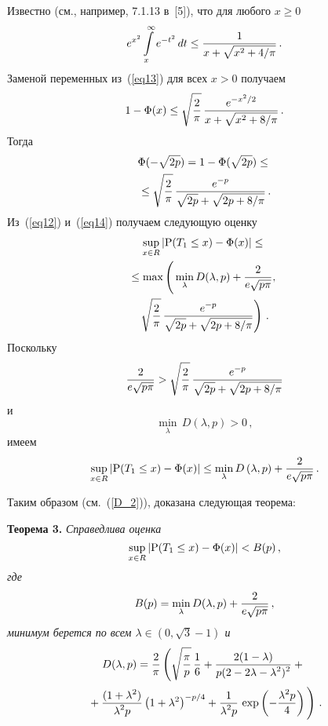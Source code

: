 \begin{multicols}{2}
Известно (см., например, 7.1.13 в~[5]), что для любого     $x \ge 0$
\begin{equation}
 e^{x^2} \int\limits^{\infty}_{x} e^{- t^2} \,dt \leq \displaystyle\frac{\displaystyle 1\mathstrut}{\displaystyle x + \sqrt{x^2 + 4/\pi}\mathstrut}\,. 
 \label{eq13}
\end{equation}
Заменой переменных из~(\ref{eq13})  для всех $x > 0$ получаем
$$
   1 -\mbox{$\Phi$}(x) \leq  \sqrt{\displaystyle\frac{\displaystyle 2\mathstrut}{\displaystyle \pi\mathstrut}}\, \displaystyle\frac{\displaystyle e^{-x^2/2}\mathstrut}{\displaystyle x + \sqrt{x^2 + 8/\pi}\mathstrut}\,.
$$
Тогда
\begin{multline}
\mbox{$\Phi$}(-\sqrt{2p})  = 1 - \mbox{$\Phi$}(\sqrt{2p})\leq{}\\
{} \leq \sqrt{\displaystyle\frac{\displaystyle 2\mathstrut}{\displaystyle \pi\mathstrut}}\, \displaystyle\frac{\displaystyle e^{-p}\mathstrut}{\displaystyle \sqrt{2p} + \sqrt{2p + 8/\pi}\mathstrut}\,.
 \label{eq14}
\end{multline}
 Из~(\ref{eq12}) и~(\ref{eq14})  получаем следующую оценку
\begin{multline*}
\sup\limits_{x \in R} |\P(T_1 \leq x) - \IP(x)| \leq{}\\
{}\leq
\max\left(\vphantom{\fr{e^{-p}}{\sqrt{2}}}
\min_{\lambda} D(\lambda,p) + \fr{2}{e\sqrt{p \pi}},\,{}\right.\\
\left.\sqrt{\fr{2}{\pi}}\, \fr{e^{-p}}{\sqrt{2p}+\sqrt{2p + 8/\pi}}\right)\,.
\end{multline*}
Поскольку       
$$
\displaystyle\frac{\displaystyle 2\mathstrut}{\displaystyle e\sqrt{p \pi}\mathstrut} > \sqrt{\displaystyle\frac{\displaystyle 2\mathstrut}{\displaystyle \pi\mathstrut}}\, \displaystyle\frac{\displaystyle e^{-p}\mathstrut}{\displaystyle \sqrt{2p}+\sqrt{2p + 8/\pi}\mathstrut}
$$
и 
$$\min\limits_{\lambda} \,D(\lambda,p) >0\,,
$$ 
имеем
\begin{equation*}
\sup\limits_{x \in R} |\mbox{\rm P}(T_1 \le x) - \mbox{$\Phi$}(x)| \leq \underset{\lambda}{\min}\,D\left(\lambda,p\right)
+ \displaystyle\frac{\displaystyle 2\mathstrut}{\displaystyle e\sqrt{p \pi}\mathstrut}\,.
\end{equation*}

Таким образом (см.~(\ref{D_2})), доказана следующая теорема:

\smallskip

\noindent
\textbf{Теорема 3.} %
\textit{Справедлива оценка}
\begin{equation*}
\sup\limits_{x \in R}|\mbox{\rm P}(T_1 \leq x) - \mbox{$\Phi$}(x) | <B(p)\,,
\end{equation*}
\textit{где}
\begin{equation}
B(p)= \underset{\lambda}{\min}\,D(\lambda,p) + \displaystyle\frac{\displaystyle 2\mathstrut}{\displaystyle e\sqrt{p \pi}\mathstrut}\,, 
\label{eq.11}
\end{equation}
\textit{минимум берется по всем $\lambda \in (0,\sqrt{3}-1)$
и}
\begin{multline*}
D(\lambda,p) =\fr{2}{\pi} \left( \sqrt{\fr{\pi}{p}}\,\fr{1}{6}
 +\fr{ 2 (1-\lambda)}{p(2-2\lambda-\lambda^2)^2}+{}\right.\\
\left. {}+ \fr{(1+
\lambda^2)}{\lambda^2 p} \left(1+\lambda^2\right)^{-p/4}
  + \fr{1}{\lambda^2 p} \,\exp \left(-\fr{\lambda^2 p}{4}\right)
  \vphantom{\sqrt{\fr{\pi}{p}}}\right)\,.
\end{multline*}


\end{multicols}
